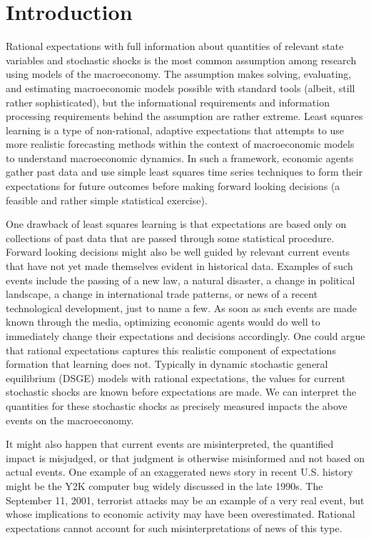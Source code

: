 \documentclass[12pt]{article}
\begin{document}
\newpage

\section{Introduction}

Rational expectations with full information about quantities of relevant state variables and stochastic shocks is the most common assumption among research using models of the macroeconomy.  The assumption makes solving, evaluating, and estimating macroeconomic models possible with standard tools (albeit, still rather sophisticated), but the informational requirements and information processing requirements behind the assumption are rather extreme.  Least squares learning is a type of non-rational, adaptive expectations that attempts to use more realistic forecasting methods within the context of macroeconomic models to understand macroeconomic dynamics.  In such a framework, economic agents gather past data and use simple least squares time series techniques to form their expectations for future outcomes before making forward looking decisions (a feasible and rather simple statistical exercise). 

One drawback of least squares learning is that expectations are based only on collections of past data that are passed through some statistical procedure.  Forward looking decisions might also be well guided by relevant current events that have not yet made themselves evident in historical data.  Examples of such events include the passing of a new law, a natural disaster, a change in political landscape, a change in international trade patterns, or news of a recent technological development, just to name a few.  As soon as such events are made known through the media, optimizing economic agents would do well to immediately change their expectations and decisions accordingly.  One could argue that rational expectations captures this realistic component of expectations formation that learning does not.  Typically in dynamic stochastic general equilibrium (DSGE) models with rational expectations, the values for current stochastic shocks are known before expectations are made.  We can interpret the quantities for these stochastic shocks as precisely measured impacts the above events on the macroeconomy.

It might also happen that current events are misinterpreted, the quantified impact is misjudged, or that judgment is otherwise misinformed and not based on actual events.  One example of an exaggerated news story in recent U.S. history might be the Y2K computer bug widely discussed in the late 1990s.  The September 11, 2001, terrorist attacks may be an example of a very real event, but whose implications to economic activity may have been overestimated.  Rational expectations cannot account for such misinterpretations of news of this type.  
\end{document}
